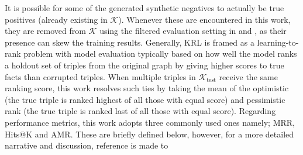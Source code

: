 \noindent It is possible for some of the generated synthetic negatives to actually be true positives (already existing in $\mathcal{K}$). Whenever these are encountered in this work, they are removed from $\mathcal{K}$ using the filtered evaluation setting in \citep{Bordes2013} and \citep{Ali2020BringingFramework}, as their presence can skew the training results. Generally, \ac{KRL} is framed as a learning-to-rank problem with model evaluation typically based on how well the model ranks a holdout set of triples from the original graph by giving higher scores to true facts than corrupted triples. When multiple triples in $\mathcal{K}_{\text{test}}$ receive the same ranking score, this work resolves such ties by taking the mean of the optimistic (the true triple is ranked highest of all those with equal score) and pessimistic rank (the true triple is ranked last of all those with equal score).
Regarding performance metrics, this work adopts three commonly used ones namely; \acf{MRR}, Hits@K and \acf{AMR}. These are briefly defined below, however, for a more detailed narrative and discussion, reference is made to \citep{Ali2020BringingFramework}


